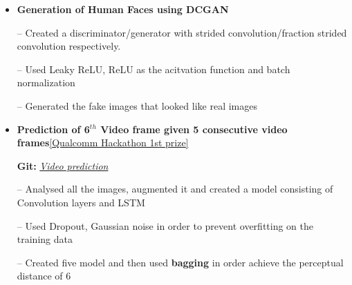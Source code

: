 \documentclass{article}
\begin{document}
\begin{itemize}
\setlength{\itemsep}{-0.15em}


\item \textbf{Generation of Human Faces using DCGAN} %

\item[--] Created a  discriminator/generator with strided convolution/fraction strided convolution respectively.
\item[--] Used Leaky ReLU, ReLU as the acitvation function and batch normalization
\item[--] Generated the fake images that looked like real images

\item \textbf{Prediction of {6$^{th}$} Video frame given 5 consecutive video frames}\hfill{\href{https://drive.google.com/file/d/1uwSr-1dlImn5JYRzPpn62ublzCWKSGr0/view?usp=sharing}{[Qualcomm Hackathon 1st prize]}}

\textbf{Git:} \href{https://github.com/153079019shariq/catz_contest}{\textit{Video prediction}}
\item[--] Analysed all the images, augmented it  and created a model consisting of Convolution layers and LSTM
\item[--] Used Dropout, Gaussian noise in order to prevent overfitting on the training data
\item[--]Created five model and then used \textbf{bagging} in order achieve the perceptual distance of 6 

\end{itemize}
\end{document}
